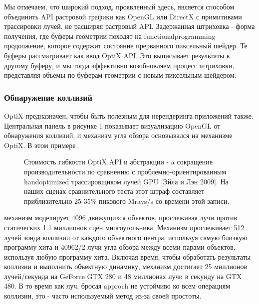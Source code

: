 Мы отмечаем, что широкий подход, проявленный здесь, является способом объединить API растровой графики как OpenGL или DirectX с примитивами трассировки лучей, не расширяя растровый API. Задержанная штриховка - форма получения, где буферы геометрии походят на functionalprogramming продолжение, которое содержит состояние прерванного пиксельный шейдер. Те буферы рассматривает как ввод OptiX API. Это выписывает результаты к другому буферу, и мы тогда эффективно возобновляем процесс штриховки, представляя объемы по буферам геометрии с новым пиксельным шейдером.
\subsubsection{ Обнаружение коллизий}
OptiX предназначен, чтобы быть полезным для нерендеринга приложений также. Центральная панель в рисунке 1 показывает визуализацию OpenGL от обнаружения коллизий, и механизм угла обзора основывался на механизме OptiX. В этом примере
\begin{figure}[h!]
\caption{Стоимость гибкости OptiX API и абстракции - a
сокращение производительности по сравнению с проблемно-ориентированным handoptimized трассировщиком лучей GPU [Эйла и Лэн 2009]. На наших сценах сравнительного теста этот штраф составляет приблизительно 25-35\% пикового Mrays/s со времени этой записи.}
\label{fig7}
\end{figure}
  механизм моделирует 4096 движущихся объектов, прослеживая лучи против статических 1.1 миллионов сцен многоугольника.
Механизм прослеживает 512 лучей зонда коллизии от каждого объектного центра, используя самую близкую программу хита и 40962/2 лучи угла обзора между всеми парами объектов, используя любую программу хита. Включая время, чтобы обработать результаты коллизии и выполнить объектную динамику, механизм достигает 25 миллионов лучей/секунда на GeForce GTX 280 и 48 миллионах
лучи в секунду на GTX 480. В то время как луч, бросая approch
не устойчиво ко всем операциям коллизии, это - часто используемый метод из-за своей простоты.

